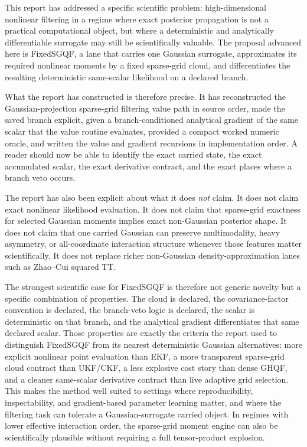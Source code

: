\documentclass[11pt]{article}
\numberwithin{equation}{section}
\begin{document}
This report has addressed a specific scientific problem: high-dimensional
nonlinear filtering in a regime where exact posterior propagation is not a
practical computational object, but where a deterministic and analytically
differentiable surrogate may still be scientifically valuable.  The proposal
advanced here is FixedSGQF, a lane that carries one Gaussian surrogate,
approximates its required nonlinear moments by a fixed sparse-grid cloud, and
differentiates the resulting deterministic same-scalar likelihood on a declared
branch.

What the report has constructed is therefore precise.  It has reconstructed the
Gaussian-projection sparse-grid filtering value path in source order, made the
saved branch explicit, given a branch-conditioned analytical gradient of the
same scalar that the value routine evaluates, provided a compact worked numeric
oracle, and written the value and gradient recursions in implementation order.
A reader should now be able to identify the exact carried state, the exact
accumulated scalar, the exact derivative contract, and the exact places where a
branch veto occurs.

The report has also been explicit about what it does \emph{not} claim.  It does
not claim exact nonlinear likelihood evaluation.  It does not claim that
sparse-grid exactness for selected Gaussian moments implies exact non-Gaussian
posterior shape.  It does not claim that one carried Gaussian can preserve
multimodality, heavy asymmetry, or all-coordinate interaction structure whenever
those features matter scientifically.  It does not replace richer non-Gaussian
density-approximation lanes such as Zhao--Cui squared TT.

The strongest scientific case for FixedSGQF is therefore not generic novelty but
a specific combination of properties.  The cloud is declared, the
covariance-factor convention is declared, the branch-veto logic is declared, the
scalar is deterministic on that branch, and the analytical gradient
differentiates that same declared scalar.  Those properties are exactly the
criteria the report used to distinguish FixedSGQF from its nearest deterministic
Gaussian alternatives: more explicit nonlinear point evaluation than EKF, a more
transparent sparse-grid cloud contract than UKF/CKF, a less explosive cost story
than dense GHQF, and a cleaner same-scalar derivative contract than live adaptive
grid selection.  This makes the method well suited to settings where
reproducibility, inspectability, and gradient-based parameter learning matter,
and where the filtering task can tolerate a Gaussian-surrogate carried object.
In regimes with lower effective interaction order, the sparse-grid moment engine
can also be scientifically plausible without requiring a full tensor-product
explosion.
\end{document}
